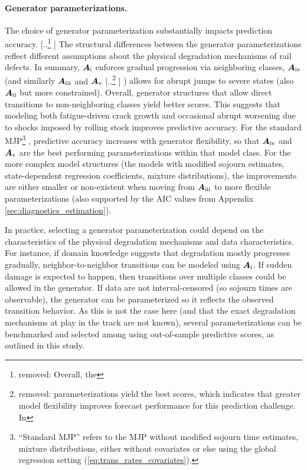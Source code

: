 \documentclass{article}
\newcommand{\RN}[1]{\textup{\uppercase\expandafter{\romannumeral#1}}}
\providecommand{\DIFadd}[1]{{\protect\color{blue} \sf #1}} %
\providecommand{\DIFdel}[1]{{\protect\color{red} [..\footnote{removed: #1} ]}} %
\providecommand{\DIFaddbegin}{} %
\providecommand{\DIFaddend}{} %
\providecommand{\DIFdelbegin}{} %
\providecommand{\DIFdelend}{} %
\begin{document}
\DIFaddbegin \paragraph{\DIFadd{Generator parameterizations.}}
\DIFaddend The choice of generator parameterization substantially impacts prediction accuracy. 
\DIFdelbegin \DIFdel{Overall, the }\DIFdelend \DIFaddbegin \DIFadd{The structural differences between the generator parameterizations reflect different assumptions about the physical degradation mechanisms of rail defects.
In summary, $\bm{A}_{\RN{1}}$ enforces gradual progression via neighboring classes, }\DIFaddend $\bm{A}_{\RN{4}}$ \DIFaddbegin \DIFadd{(and similarly $\bm{A}_{\RN{3}}$ }\DIFaddend and $\bm{A}_{\RN{5}}$\DIFdelbegin \DIFdel{parameterizations yield the best scores, which indicates that greater model flexibility improves forecast performance for this prediction challenge.
In \Cref{sec:results_transient_dist_markov}}\DIFdelend \DIFaddbegin \DIFadd{) allows for abrupt jumps to severe states (also $\bm{A}_{\RN{2}}$ but more constrained). 
Overall, generator structures that allow direct transitions to non-neighboring classes yield better scores. This suggests that modeling both fatigue-driven crack growth and occasional abrupt worsening due to shocks imposed by rolling stock improves predictive accuracy.
For the standard MJP}\footnote{\DIFadd{``Standard MJP'' refers to the MJP without modified sojourn time estimates, mixture distributions, either without covariates or else using the global regression setting (\cref{eq:trans_rates_covariates}).}}\DIFadd{, predictive accuracy increases with generator flexibility, so that $\bm{A}_{\RN{4}}$ and $\bm{A}_{\RN{5}}$ are the best performing parameterizations within that model class. For the more complex model structures (the models with modified sojourn estimates, state-dependent regression coefficients, mixture distributions), the improvements are either smaller or non-existent when moving from $\bm{A}_{\RN{3}}$ to more flexible parameterizations (also supported by the AIC values from Appendix \ref{sec:diagnostics_estimation}).
}

\DIFadd{In practice, selecting a generator parameterization could depend on the characteristics of the physical degradation mechanisms and data characteristics. For instance, if domain knowledge suggests that degradation mostly progresses gradually, neighbor-to-neighbor transitions can be modeled using $\bm{A}_{\RN{1}}$. If sudden damage is expected to happen, then transitions over multiple classes could be allowed in the generator.
If data are not interval-censored (so sojourn times are observable), the generator can be parameterized so it reflects the observed transition behavior. As this is not the case here (and that the exact degradation mechanisms at play in the track are not known), several parameterizations can be benchmarked and selected among using out-of-sample predictive scores, as outlined in this study.
}
\end{document}
